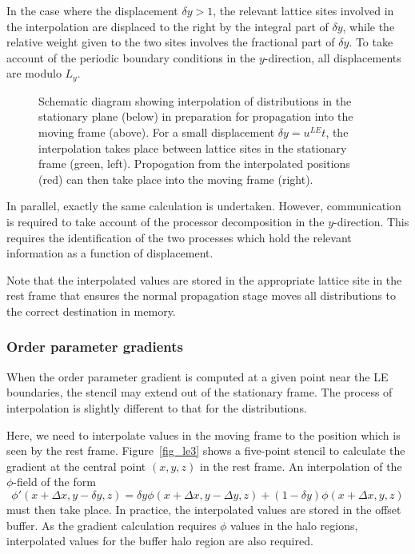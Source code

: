 In the case where the displacement $\delta y > 1$, the relevant
lattice sites involved in the interpolation are displaced to the right
by the integral part of $\delta y$, while the relative weight given to
the two sites involves
the fractional part of $\delta y$. To take account of the periodic
boundary conditions
in the $y$-direction, all displacements are modulo $L_y$.


\begin{figure}[h]
\begin{center}
\end{center}
\caption{Schematic diagram showing interpolation of distributions in the
stationary plane (below) in preparation for propagation into the moving
frame (above). For a small displacement $\delta y = u^{LE} t$, the
interpolation takes place between lattice sites in the stationary frame
(green, left). Propogation from the interpolated positions (red) can
then take place into the moving frame (right).}
\label{fig_le2}
\end{figure}


In parallel, exactly the same calculation is undertaken. However,
communication is required to take account of the processor
decomposition in the $y$-direction. This requires the identification
of the two processes which hold the relevant information as a function
of displacement. 

Note that the interpolated values are stored in the appropriate lattice
site in the rest frame that ensures the normal propagation stage moves all
distributions to the correct destination in memory.

\subsubsection{Order parameter gradients}

When the order parameter gradient is computed at a given point
near the LE boundaries, the stencil may extend out of the stationary
frame. The process of interpolation is slightly different to that
for the distributions.

Here, we need to interpolate values in the moving frame to the position
which is seen by the rest frame. Figure~\ref{fig_le3} shows a five-point
stencil to calculate the gradient at the central point $(x,y,z)$ in the
rest frame. An interpolation of the $\phi$-field of the form
\begin{equation}
\phi'(x + \Delta x, y - \delta y, z) =
\delta y \phi(x + \Delta x,  y - \Delta y, z) + 
(1 - \delta y) \phi(x + \Delta x, y, z)
\end{equation}
must then take place. In practice, the interpolated values are stored
in the offset buffer. As the gradient calculation requires $\phi$
values in the halo regions, interpolated values for the buffer halo
region are also required.

